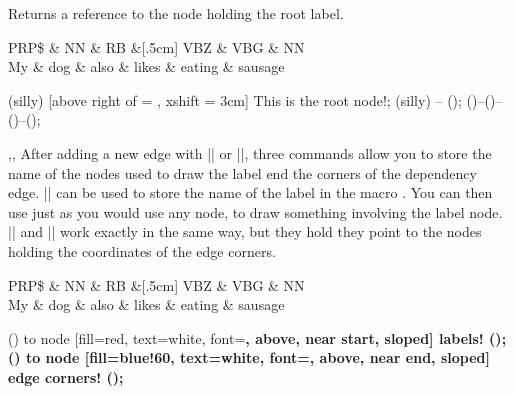\documentclass[a4paper]{ltxdoc}
\begin{document}
\begin{command}{\rootref}
   Returns a reference to the node holding the root label.
\begin{codeexample}[]
\begin{dependency}
   \begin{deptext}[column sep=.5cm, row sep=.1ex]
      PRP\$ \& NN \& RB \&[.5cm] VBZ \& VBG \& NN \\
      My \& dog \& also \& likes \& eating \& sausage \\
   \end{deptext}
   \node (silly) [above right of = \rootref, xshift = 3cm] {This is the root node!};
    (silly) -- (\rootref);
    (\rootref)--()--()--(\rootref);
\end{dependency}
\end{codeexample}

\end{command}

\begin{commandlist}{\storelabelnode{},\storefirstcorner{},\storesecondcorner{}}
   After adding a new edge with |\depedge| or |\groupedge|, three commands allow you to store the name of the nodes used to draw the label end the corners of the dependency edge. |\storelabelnode| can be used to store the name of the label in the macro . You can then use  just as you would use any node, to draw something involving the label node. |\storefirstcorner| and |\storesecondcorner| work exactly in the same way, but they hold they point to the nodes holding the coordinates of the edge corners.

\begin{codeexample}[]
\begin{dependency}
   \begin{deptext}[column sep=.5cm, row sep=.1ex]
      PRP\$ \& NN \& RB \&[.5cm] VBZ \& VBG \& NN \\
      My \& dog \& also \& likes \& eating \& sausage \\
   \end{deptext}
   \storelabelnode\firstlab
   \storefirstcorner\firstcorner
   \storelabelnode\secondlab
   \storesecondcorner\secondcorner
   \draw [<->,out=90,in=-90, thick, red] (\firstlab) to 
      node [fill=red, text=white, font=\bfseries, above, near start, sloped] 
      {labels!} (\secondlab);
   \draw [<->, out=-90,in=90, thick, blue!60] (\firstcorner) to 
      node [fill=blue!60, text=white, font=\bfseries, above, near end, sloped] 
      {edge corners!} (\secondcorner);
\end{dependency}
\end{codeexample}
\end{commandlist}
\end{document}

